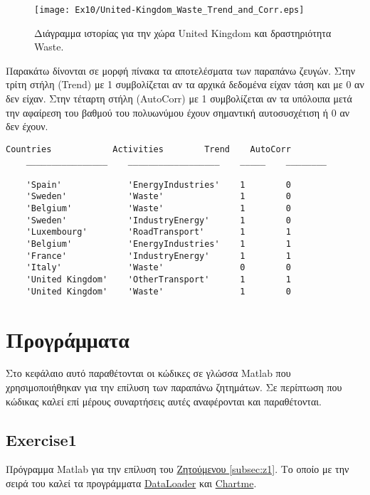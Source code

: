 \documentclass[11pt]{scrartcl} %
\begin{document}
\begin{figure}[H]

	\centering
	\texttt{[image: Ex10/United-Kingdom\_Waste\_Trend\_and\_Corr.eps]}	
\caption{Διάγραμμα ιστορίας για την χώρα United Kingdom και δραστηριότητα Waste.}
\label{fig:z1010} 
\end{figure}



Παρακάτω δίνονται σε μορφή πίνακα τα αποτελέσματα των παραπάνω ζευγών. Στην τρίτη στήλη (Trend) με 1 συμβολίζεται αν τα αρχικά δεδομένα είχαν τάση και με 0 αν δεν είχαν. Στην τέταρτη στήλη (AutoCorr) με 1 συμβολίζεται αν τα υπόλοιπα μετά την αφαίρεση του βαθμού του πολυωνύμου έχουν σημαντική αυτοσυσχέτιση ή 0 αν δεν έχουν. 


\begin{Verbatim}[fontsize=\small]
       Countries            Activities        Trend    AutoCorr
    ________________    __________________    _____    ________

    'Spain'             'EnergyIndustries'    1        0       
    'Sweden'            'Waste'               1        0       
    'Belgium'           'Waste'               1        0       
    'Sweden'            'IndustryEnergy'      1        0       
    'Luxembourg'        'RoadTransport'       1        1       
    'Belgium'           'EnergyIndustries'    1        1       
    'France'            'IndustryEnergy'      1        1       
    'Italy'             'Waste'               0        0       
    'United Kingdom'    'OtherTransport'      1        1       
    'United Kingdom'    'Waste'               1        0 
\end{Verbatim}

 

 
 
 


\section{Προγράμματα}
\label{sec:Prog}
Στο κεφάλαιο αυτό παραθέτονται οι κώδικες σε γλώσσα Matlab που χρησιμοποιήθηκαν για την επίλυση των παραπάνω ζητημάτων. Σε περίπτωση που  κώδικας καλεί επί μέρους συναρτήσεις αυτές αναφέρονται και παραθέτονται. 

\subsection{Exercise1}
\label{prog:1}
Πρόγραμμα Matlab για την επίλυση του \hyperref[subsec:z1]{Ζητούμενου \ref*{subsec:z1}}. Το οποίο με την σειρά του καλεί τα προγράμματα \hyperref[prog:DataLoader]{DataLoader} και \hyperref[prog:Chartme]{Chartme}.

\end{document}
